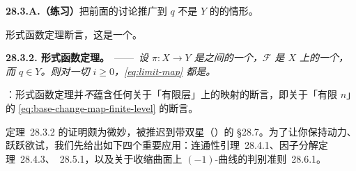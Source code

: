 \textbf{28.3.A.（练习）}\quad 把前面的讨论推广到 $q$ 不是 $Y$ 的\trClosedPoint{}的情形。

形式函数定理断言，这是一个\trIsomorphism。

\textbf{28.3.2. 形式函数定理。}\ ——\ \emph{设 $\pi\colon X\to Y$ 是\trLocally\trNoether{}\trScheme{}之间的一个\trProper\trMorphism，$\mathscr{F}$ 是 $X$ 上的一个\trCoherentSheaf，而 $q\in Y$。则对一切 $i\ge 0$，\eqref{eq:limit-map} 都是\trIsomorphism。}

\trhWarning{}：形式函数定理并\emph{不}蕴含任何关于「有限层」上的映射的断言，即关于「有限 $n$」的 \eqref{eq:base-change-map-finite-level} 的断言。

\mbox{定理~28.3.2} 的证明颇为微妙，被推迟到带双星（\extrahard）的 \S28.7。为了让你保持动力、跃跃欲试，我们先给出如下四个重要应用：\mbox{\trZariski{}连通性引理~28.4.1}、\mbox{\trStein{}因子分解定理~28.4.3}、\mbox{\trZariskiMainTheorem~28.5.1}，以及关于收缩曲面上 $(-1)$-曲线的\mbox{\trCastelnuovo{}判别准则~28.6.1}。


